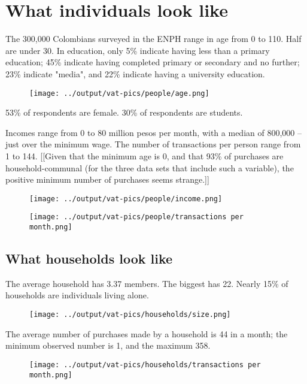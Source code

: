 \documentclass[preprint,12pt]{elsarticle}
\begin{document}
\section{What individuals look like}

The 300,000 Colombians surveyed in the ENPH range in age from 0 to 110. Half are under 30. In education, only 5\% indicate having less than a primary education; 45\% indicate having completed primary or secondary and no further; 23\% indicate "media", and 22\% indicate having a university education.
\begin{figure}[t]
\centering\texttt{[image: ../output/vat-pics/people/age.png]}
\end{figure}

53\% of respondents are female. 30\% of respondents are students. 

Incomes range from 0 to 80 million pesos per month, with a median of 800,000 -- just over the minimum wage. The number of transactions per person range from 1 to 144. [[Given that the minimum age is 0, and that 93\% of purchases are household-communal (for the three data sets that include such a variable), the positive minimum number of purchases seems strange.]]
\begin{figure}[t]
\centering\texttt{[image: ../output/vat-pics/people/income.png]}
\end{figure}

\begin{figure}[t]
\centering\texttt{[image: ../output/vat-pics/people/transactions per month.png]}
\end{figure}


\subsection{What households look like}

The average household has 3.37 members. The biggest has 22. Nearly 15\% of households are individuals living alone.
\begin{figure}[t]
\centering\texttt{[image: ../output/vat-pics/households/size.png]}
\end{figure}

The average number of purchases made by a household is 44 in a month; the minimum observed number is 1, and the maximum 358.
\begin{figure}[t]
\centering\texttt{[image: ../output/vat-pics/households/transactions per month.png]}
\end{figure}
\end{document}
